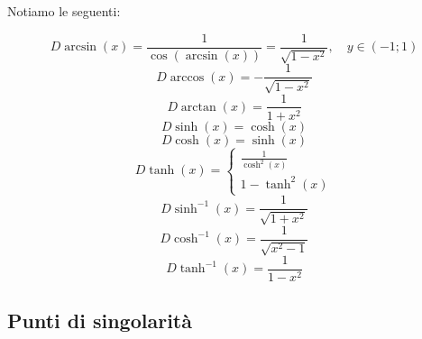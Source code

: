 \documentclass[a4paper]{article}
\begin{document}
%
%

\pagebreak

Notiamo le seguenti:

\[
    D\arcsin(x) = \frac{1}{\cos(\arcsin(x))}
    = \frac{1}{\sqrt{1 - x^2}}, \quad y \in (-1;1)
\]
\[
    D\arccos(x) = -\frac{1}{\sqrt{1 - x^2}}
\]
\[
    D\arctan(x) = \frac{1}{1+x^2}
\]
\[
    D\sinh(x) = \cosh(x)
\]
\[
    D\cosh(x) = \sinh(x)
\]
\[
    D\tanh(x) = \begin{cases}
        \frac{1}{\cosh^2(x)} \\
        1 - \tanh^2(x)
    \end{cases}
\]
\[
    D\sinh^{-1}(x) = \frac{1}{\sqrt{1 + x^2}}
\]
\[
    D\cosh^{-1}(x) = \frac{1}{\sqrt{x^2 - 1}}
\]
\[
    D\tanh^{-1}(x) = \frac{1}{1-x^2}
\]

\subsection{Punti di singolarità}
\end{document}
